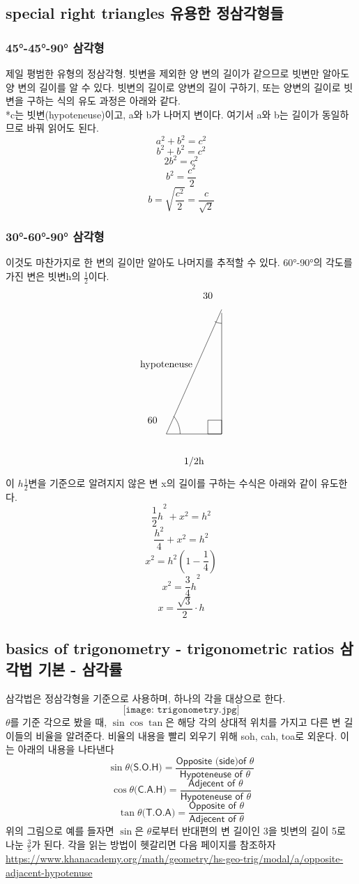 \documentclass{article}
\begin{document}
\subsection{special right triangles 유용한 정삼각형들}
\subsubsection{\ang{45}-\ang{45}-\ang{90} 삼각형}
제일 평범한 유형의 정삼각형. 빗변을 제외한 양 변의 길이가 같으므로 빗변만 알아도 양 변의 길이를 알 수 있다. 빗변의 길이로 양변의 길이 구하기, 또는 양변의 길이로 빗변을 구하는 식의 유도 과정은 아래와 같다.\\
*c는 빗변(hypoteneuse)이고, a와 b가 나머지 변이다. 여기서 a와 b는 길이가 동일하므로 바꿔 읽어도 된다.
$$a^{2}+b^{2}=c^{2}$$
$$b^{2}+b^{2}=c^{2}$$
$$2b^{2}=c^{2}$$
$$b^{2}=\frac{c^{2}}{2}$$
$$b=\sqrt{\frac{c^{2}}{2}}=\frac{c}{\sqrt{2}}$$
\subsubsection{\ang{30}-\ang{60}-\ang{90} 삼각형}
이것도 마찬가지로 한 변의 길이만 알아도 나머지를 추적할 수 있다. \ang{60}-\ang{90}의 각도를 가진 변은 빗변h의 $\frac{1}{2}$이다.
$$
\begin{tikzpicture}

\draw (2,3) node (v1) {} -- (0,-1.5) -- (2,-1.5) -- (v1);
\draw (0.5,-1.5) arc (0:40:1);


\draw (2,2.5) arc (-89.999:-120:0.5);
\draw  (2,-1) rectangle (1.5,-1.5);
\node at (-0.5,-1) {60};
\node at (1.5,3.5) {30};
\node at (0,1) {hypoteneuse};
\node at (1,-2.5) {1/2h};
\end{tikzpicture}
$$
이 $h\frac{1}{2}$변을 기준으로 알려지지 않은 변 x의 길이를 구하는 수식은 아래와 같이 유도한다.
$${\frac{1}{2}h}^{2}+x^{2}=h^{2}$$
$$\frac{h^{2}}{4}+x^{2}=h^{2}$$
$$x^{2}=h^{2}(1-\frac{1}{4})$$
$$x^{2}={\frac{3}{4}h}^{2}$$
$$x={\frac{\sqrt{3}}{2}}{\cdot}h$$
\subsection{basics of trigonometry - trigonometric ratios 삼각법 기본 - 삼각률}
삼각법은 정삼각형을 기준으로 사용하며, 하나의 각을 대상으로 한다.
$$\texttt{[image: trigonometry.jpg]}$$
$\theta$를 기준 각으로 봤을 때, $\sin \cos \tan$은 해당 각의 상대적 위치를 가지고 다른 변 길이들의 비율을 알려준다. 비율의 내용을 빨리 외우기 위해 soh, cah, toa로 외운다. 이는 아래의 내용을 나타낸다\\
$${\sin\theta}\textsf{(S.O.H)}=\frac{\textsf{Opposite (side)of $\theta$}}{\textsf{Hypoteneuse of $\theta$}}$$
$${\cos\theta}\textsf{(C.A.H)}=\frac{\textsf{Adjecent of $\theta$}}{\textsf{Hypoteneuse of $\theta$}}$$
$${\tan\theta}\textsf{(T.O.A)}=\frac{\textsf{Opposite of $\theta$}}{\textsf{Adjecent of $\theta$}}$$
위의 그림으로 예를 들자면 $\sin$은 $\theta$로부터 반대편의 변 길이인 3을 빗변의 길이 5로 나눈 $\frac{3}{5}$가 된다. 각을 읽는 방법이 헷갈리면 다음 페이지를 참조하자\\
\url{https://www.khanacademy.org/math/geometry/hs-geo-trig/modal/a/opposite-adjacent-hypotenuse}
\end{document}
